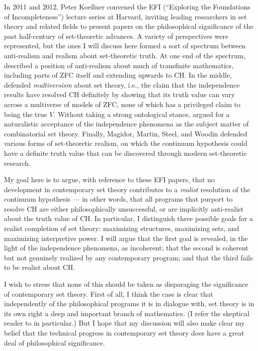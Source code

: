 \documentclass[letterpaper,12pt]{article}
\begin{document}
In 2011 and 2012, Peter Koellner convened the EFI (``Exploring the Foundations of Incompleteness'') lecture series at Harvard, inviting leading researchers in set theory and related fields to present papers on the philosophical significance of the past half-century of set-theoretic advances. A variety of perspectives were represented, but the ones I will discuss here formed a sort of spectrum between anti-realism and realism about set-theoretic truth. At one end of the spectrum, \cite{feferman2011ch} described a position of anti-realism about much of transfinite mathematics, including parts of ZFC itself and extending upwards to CH. In the middle, \cite{hamkins2012set} defended \emph{multiversism} about set theory, i.e., the claim that the independence results have resolved CH definitely by showing that its truth value can vary across a multiverse of models of ZFC, none of which has a privileged claim to being the true $V$. Without taking a strong ontological stance, \cite{cummings2012challenges} argued for a naturalistic acceptance of the independence phenomena as the subject matter of combinatorial set theory. Finally, Magidor, Martin, Steel, and Woodin defended various forms of set-theoretic realism, on which the continuum hypothesis could have a definite truth value that can be discovered through modern set-theoretic research.

My goal here is to argue, with reference to these EFI papers, that no development in contemporary set theory contributes to a \emph{realist} resolution of the continuum hypothesis --- in other words, that all programs that purport to resolve CH are either philosophically unsuccessful, or are implicitly anti-realist about the truth value of CH. In particular, I distinguish three possible goals for a realist completion of set theory: maximizing structures, maximizing sets, and maximizing interpretive power. I will argue that the first goal is revealed, in the light of the independence phenomena, as incoherent; that the second is coherent but not genuinely realized by any contemporary program; and that the third fails to be realist about CH.

I wish to stress that none of this should be taken as disparaging the significance of contemporary set theory. First of all, I think the case is clear that independently of the philosophical programs it is in dialogue with, set theory is in its own right a deep and important branch of mathematics. (I refer the skeptical reader to \cite{cummings2012challenges} in particular.) But I hope that my discussion will also make clear my belief that the technical progress in contemporary set theory does have a great deal of philosophical significance.
\end{document}
